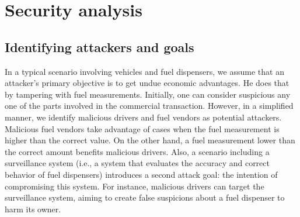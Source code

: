 \documentclass[sigplan]{acmart}
\begin{document}

\section{Security analysis}
\subsection{Identifying attackers and goals}
In a typical scenario involving vehicles and fuel dispensers, we assume that an attacker's primary objective is to get undue economic advantages.
He does that by tampering with fuel measurements.
Initially, one can consider suspicious any one of the parts involved in the commercial transaction.
However, in a simplified manner, we identify malicious drivers and fuel vendors as potential attackers.
Malicious fuel vendors take advantage of cases when the fuel measurement is higher than the correct value.
On the other hand, a fuel measurement lower than the correct amount benefits malicious drivers.
Also, a scenario including a surveillance system (i.e., a system that evaluates the accuracy and correct behavior of fuel dispensers) introduces a second attack goal: the intention of compromising this system.
For instance, malicious drivers can target the surveillance system, aiming to create false suspicions about a fuel dispenser to harm its owner.
\end{document}
